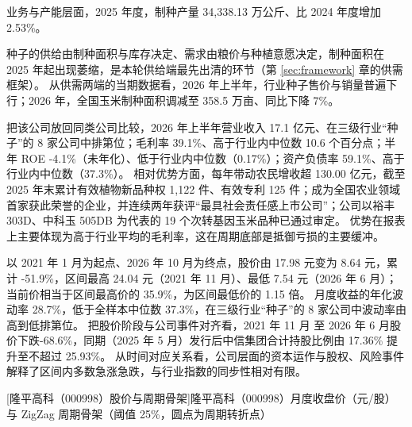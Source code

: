  业务与产能层面，2025 年度，制种产量 34,338.13 万公斤、比 2024 年度增加 2.53\%。

 种子的供给由制种面积与库存决定、需求由粮价与种植意愿决定，制种面积在 2025 年起出现萎缩，是本轮供给端最先出清的环节（第 \ref{sec:framework} 章的供需框架）。 从供需两端的当期数据看，2026 年上半年，行业种子售价与销量普遍下行；2026 年，全国玉米制种面积调减至 358.5 万亩、同比下降 7\%。

 把该公司放回同类公司比较，2026 年上半年营业收入 17.1 亿元、在三级行业“种子”的 8 家公司中排第位；毛利率 39.1\%、高于行业内中位数 10.6 个百分点；半年 ROE -4.1\%（未年化）、低于行业内中位数（0.17\%）；资产负债率 59.1\%、高于行业内中位数（37.3\%）。 相对优势方面，每年带动农民增收超 130.00 亿元，截至 2025 年末累计有效植物新品种权 1,122 件、有效专利 125 件；成为全国农业领域首家获此荣誉的企业，并连续两年获评“最具社会责任感上市公司”；公司以裕丰 303D、中科玉 505DB 为代表的 19 个次转基因玉米品种已通过审定。 优势在报表上主要体现为高于行业平均的毛利率，这在周期底部是抵御亏损的主要缓冲。

 以 2021 年 1 月为起点、2026 年 10 月为终点，股价由 17.98 元变为 8.64 元，累计 -51.9\%，区间最高 24.04 元（2021 年 11 月）、最低 7.54 元（2026 年 6 月）；当前价相当于区间最高价的 35.9\%，为区间最低价的 1.15 倍。 月度收益的年化波动率 28.7\%，低于全样本中位数 37.3\%，在三级行业“种子”的 8 家公司中波动率由高到低排第位。 把股价阶段与公司事件对齐看，2021 年 11 月 至 2026 年 6 月股价下跌-68.6\%，同期（2025 年 5 月）发行后中信集团合计持股比例由 17.36\% 提升至不超过 25.93\%。 从时间对应关系看，公司层面的资本运作与股权、风险事件解释了区间内多数急涨急跌，与行业指数的同步性相对有限。

\begin{center}
\begin{minipage}{\textwidth}\centering
{}

[隆平高科（000998）股价与周期骨架]{隆平高科（000998）月度收盘价（元/股）与 ZigZag 周期骨架（阈值 25\%，圆点为周期转折点）}
\end{minipage}
\end{center}

